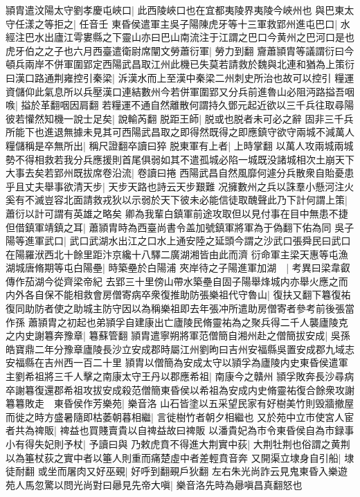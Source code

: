 頴胄遣汶陽太守劉孝慶屯峽口|{
	此西陵峽口也在宜都夷陵界夷陵今峽州也}
與巴東太守任漾之等拒之|{
	任音壬}
東昏侯遣軍主吳子陽陳虎牙等十三軍救郢州進屯巴口|{
	水經注巴水出廬江雩婁縣之下靈山亦曰巴山南流注于江謂之巴口今黄州之巴河口是也}
虎牙伯之之子也六月西臺遣衛尉席闡文勞蕭衍軍|{
	勞力到翻}
齎蕭頴胄等議謂衍曰今頓兵兩岸不併軍圍郢定西陽武昌取江州此機已失莫若請救於魏與北連和猶為上策衍曰漢口路通荆雍控引秦梁|{
	泝漢水而上至漢中秦梁二州刺史所治也故可以控引}
糧運資儲仰此氣息所以兵壓漢口連結數州今若併軍圍郢又分兵前進魯山必阻沔路搤吾咽㗋|{
	搤於革翻咽因肩翻}
若糧運不通自然離散何謂持久鄧元起近欲以三千兵往取尋陽彼若懽然知機一說士足矣|{
	說輸芮翻}
脱距王師|{
	脱或也脱者未可必之辭}
固非三千兵所能下也進退無據未見其可西陽武昌取之即得然既得之即應鎮守欲守兩城不減萬人糧儲稱是卒無所出|{
	稱尺證翻卒讀曰猝}
脱東軍有上者|{
	上時掌翻}
以萬人攻兩城兩城勢不得相救若我分兵應援則首尾俱弱如其不遣孤城必陷一城既没諸城相次土崩天下大事去矣若郢州既拔席卷沿流|{
	卷讀曰捲}
西陽武昌自然風靡何遽分兵散衆自貽憂患乎且丈夫舉事欲清天步|{
	天步天路也詩云天步艱難}
况擁數州之兵以誅羣小懸河注火奚有不滅豈容北面請救戎狄以示弱於天下彼未必能信徒取醜聲此乃下計何謂上策|{
	蕭衍以計可謂有英雄之略矣}
卿為我輩白鎮軍前途攻取但以見付事在目中無患不捷但借鎮軍靖鎮之耳|{
	蕭頴胄時為西臺尚書令盖加號鎮軍將軍為于偽翻下佑為同}
吳子陽等進軍武口|{
	武口武湖水出江之口水上通安陸之延頭今謂之沙武口張舜民曰武口在陽羅洑西北十餘里距汴京纔十八驛二廣湖湘皆由此而濟}
衍命軍主梁天惠等屯漁湖城唐脩期等屯白陽壘|{
	時築壘於白陽浦}
夾岸待之子陽進軍加湖　|{
	考異曰梁韋叡傳作茄湖今從齊梁帝紀}
去郢三十里傍山帶水築壘自固子陽舉烽城内亦舉火應之而内外各自保不能相救會房僧寄病卒衆復推助防張樂祖代守魯山|{
	復扶又翻下篹復祐復同助防者使之助城主防守因以為稱樂祖即去年張冲所遣助房僧寄者參考前後張當作孫}
蕭頴胄之初起也弟頴孚自建康出亡廬陵民脩靈祐為之聚兵得二千人襲廬陵克之内史謝篹奔豫章|{
	篹蘇管翻}
頴胄遣寧朔將軍范僧簡自湘州赴之僧簡拔安成|{
	吳孫皓寶鼎二年分豫章廬陵長沙立安成郡時屬江州劉昫曰吉州安福縣吳置安成郡九域志安福縣在吉州西一百二十里}
頴胄以僧簡為安成太守以頴孚為廬陵内史東昏侯遣軍主劉希祖將三千人擊之南康太守王丹以郡應希祖|{
	南康今之贛州}
頴孚敗奔長沙尋病卒謝篹復還郡希祖攻拔安成殺范僧簡東昏侯以希祖為安成内史脩靈祐復合餘衆攻謝篹篹敗走　東昏侯作芳樂苑|{
	樂音洛}
山石皆塗以五采望民家有好樹美竹則毁牆撤屋而徙之時方盛暑隨即枯萎朝暮相繼|{
	言徙樹竹者朝夕相繼也}
又於苑中立市使宮人宦者共為禆販|{
	禆益也買賤賣貴以自禆益故曰禆販}
以潘貴妃為市令東昏侯自為市録事小有得失妃則予杖|{
	予讀曰與}
乃敕虎賁不得進大荆實中荻|{
	大荆牡荆也俗謂之黄荆以為箠杖荻之實中者以箠人則重而痛楚虛中者差輕賁音奔}
又開渠立埭身自引船|{
	埭徒耐翻}
或坐而屠肉又好巫覡|{
	好呼到翻覡戶狄翻}
左右朱光尚詐云見鬼東昏入樂遊苑人馬忽驚以問光尚對曰曏見先帝大嗔|{
	樂音洛先時為曏嗔昌真翻怒也}
